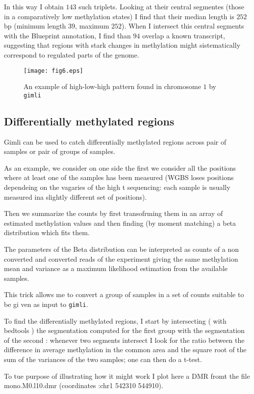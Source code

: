 \documentclass[12pt]{amsart}
\newcommand{\gimli}{\texttt{gimli}}
\begin{document}
In this way I obtain $143$ such triplets. Looking at their central segmentes
(those in a comparatively low methylation states) I find that their median length is
$252$bp (minimum length $39$, maximum $252$). When I intersect this central segments with the Blueprint
annotation, I find than $94$ overlap a known transcript, suggesting that regions with stark 
changes in methylation
might sistematically correspond to regulated parts of the genome.

\begin{figure}\label{fig6}
\texttt{[image: fig6.eps]}
\caption{An example of high-low-high pattern found in chromosome $1$ by \gimli{}}
\end{figure}

\subsection{Differentially methylated regions}

Gimli can be used to catch differentially methylated regions across pair of samples
or pair of groups of samples.

As an example, we consider on one side the 
first we consider all the positions where at least one of the samples has been measured
(WGBS loses positions dependeing on the vagaries of the high t sequencing: each sample
is usually measured ina slightly different set of positions).

Then we summarize the counts by first transofrming them in an array of estimated methylation
values and then finding (by moment matching) a beta distribution which fits them.

The parameters of the Beta distribution can be interpreted as counts of 
a non converted and converted reads of the experiment giving the same methylation mean 
and variance as a maximum likelihood estimation from the available samples.

This trick allows me to convert a group of samples in a set of counts suitable to be gi
ven as input to \gimli{}.

To find the differentially methylated regions, I start by intersecting
( with bedtools\cite{bedtools} ) the segmentation computed for the first group
with the segmentation of the second : whenever two segments intersect I look
for the ratio between the difference in average methylation in the common area 
and the square root of the sum of the variances of the two samples; one can then
do a t-test.

To tue purpose of illustrating how it might work I plot here a DMR 
fromt the file mono.M0.l10.dmr  (coordinates :chr1	542310	544910).
\end{document}
